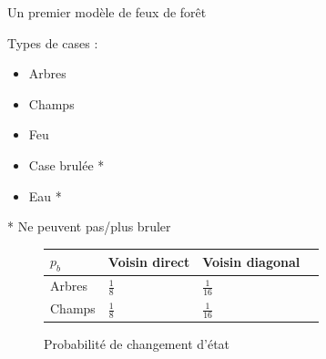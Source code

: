 \documentclass{beamer}
\begin{document}
\begin{frame}{Un premier modèle de feux de forêt \hyperlink{jump}{\beamerbutton{ }} \hypertarget{4}{\beamerbutton{ }}}
    \begin{block}{Types de cases :}
        \begin{itemize}
            \item Arbres
            \item Champs
            \item Feu
            \item Case brulée *
            \item Eau *
        \end{itemize}

        * Ne peuvent pas/plus bruler
    \end{block}

    \begin{figure}
        \begin{center}
            \renewcommand{\arraystretch}{2}
            \setlength{\extrarowheight}{-3pt}
            \begin{table}
                \begin{tabular}{ |C{2cm}|L{3cm}|C{3cm}|N }
                \hline
                $p_{b}$ & Voisin direct & Voisin diagonal \\
                \hline 
                Arbres & \centering $\tfrac{1}{8}$ & $\tfrac{1}{16}$ \\ 
                \hline
                Champs & \centering $\tfrac{1}{8}$ & $\tfrac{1}{16}$ \\
                \hline 
                \end{tabular}
            \end{table}
        \end{center}
        \caption{Probabilité de changement d'état}
    \end{figure}
\end{frame}
\end{document}
